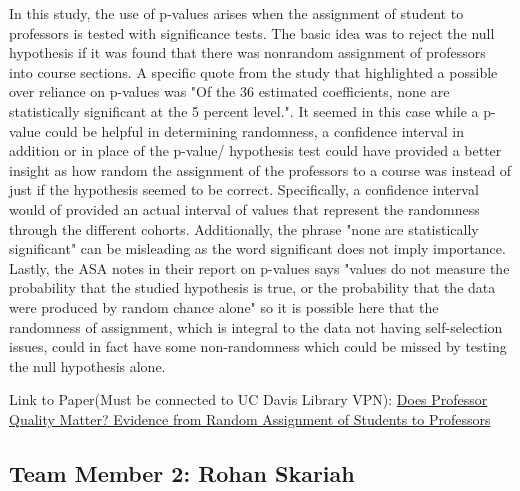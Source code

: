 \documentclass{article}
\numberwithin{equation}{section}
\begin{document}
In this study, the use of p-values arises when the assignment of student to professors is tested with significance tests. The basic idea was to reject the null hypothesis if it was found that there was nonrandom assignment of professors into course sections. A specific quote from the study that highlighted a possible over reliance on p-values was "Of the 36 estimated coefficients, none are statistically significant at the 5 percent level.". It seemed in this case while a p-value could be helpful in determining randomness, a confidence interval in addition or in place of the p-value/ hypothesis test could have provided a better insight as how random the assignment of the professors to a course was instead of just if the hypothesis seemed to be correct. Specifically, a confidence interval would of provided an actual interval of values that represent the randomness through the different cohorts. Additionally, the phrase "none are statistically significant" can be misleading as the word significant does not imply importance. Lastly, the ASA notes in their report on p-values says "values do not measure the probability that the studied hypothesis is true, or the probability that the data were produced by random chance alone" so it  is possible here that the randomness of assignment, which is integral to the data not having self-selection issues, could in fact have some non-randomness which could be missed by testing the null hypothesis alone. 

Link to Paper(Must be connected to UC Davis Library VPN): \href{https://www.journals.uchicago.edu/doi/pdfplus/10.1086\%2F653808}{Does Professor Quality Matter? Evidence from
Random Assignment of Students to Professors}

\subsection{Team Member 2: Rohan Skariah}
\end{document}
